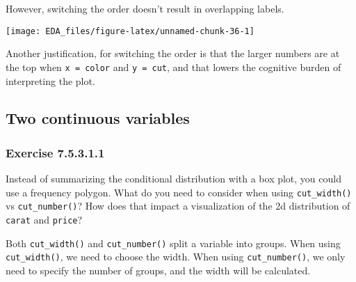 \documentclass[]{book}
\newenvironment{Shaded}{\begin{snugshade}}{\end{snugshade}}
\newcommand{\DataTypeTok}[1]{\textcolor[rgb]{0.13,0.29,0.53}{#1}}
\newcommand{\KeywordTok}[1]{\textcolor[rgb]{0.13,0.29,0.53}{\textbf{#1}}}
\newcommand{\NormalTok}[1]{#1}
\newcommand{\OperatorTok}[1]{\textcolor[rgb]{0.81,0.36,0.00}{\textbf{#1}}}
\newcommand{\StringTok}[1]{\textcolor[rgb]{0.31,0.60,0.02}{#1}}
\theoremstyle{plain}
\theoremstyle{remark}
\begin{document}
However, switching the order doesn't result in overlapping labels.

\begin{Shaded}
\end{Shaded}

\begin{center}\texttt{[image: EDA\_files/figure-latex/unnamed-chunk-36-1]} \end{center}

Another justification, for switching the order is that the larger
numbers are at the top when \texttt{x\ =\ color} and \texttt{y\ =\ cut},
and that lowers the cognitive burden of interpreting the plot.

\hypertarget{two-continuous-variables}{%
\subsection{Two continuous variables}\label{two-continuous-variables}}

\hypertarget{exercise-7.5.3.1.1}{%
\subsubsection*{\texorpdfstring{Exercise
{7.5.3.1.1}}{Exercise 7.5.3.1.1}}\label{exercise-7.5.3.1.1}}

Instead of summarizing the conditional distribution with a box plot, you
could use a frequency polygon. What do you need to consider when using
\texttt{cut\_width()} vs \texttt{cut\_number()}? How does that impact a
visualization of the 2d distribution of \texttt{carat} and
\texttt{price}?

Both \texttt{cut\_width()} and \texttt{cut\_number()} split a variable
into groups. When using \texttt{cut\_width()}, we need to choose the
width. When using \texttt{cut\_number()}, we only need to specify the
number of groups, and the width will be calculated.
\end{document}

